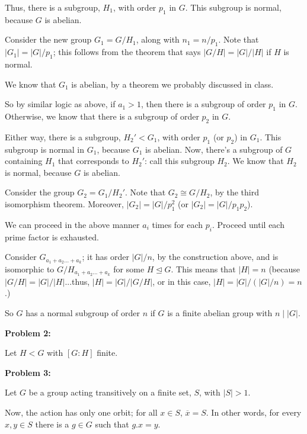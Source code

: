 \documentclass[a4paper,12pt]{article}
\newcommand{\tab}{\hspace{4mm}} %
\newcommand{\shunt}{\vspace{20mm}}
\newcommand{\absval}[1]{\lvert #1 \rvert}
\newcommand{\subgp}{\mathrel{\unlhd}}
\begin{document}
\tab Thus, there is a subgroup, $H_1$, with order $p_1$ in $G$. This subgroup is normal, because $G$ is abelian. 

\tab Consider the new group $G_1=G/H_1$, along with $n_1 = n/p_1$. Note that $\absval{G_1} = \absval{G}/p_1$; this follows from the theorem that says $\absval{G/H} = \absval{G}/\absval{H}$ if $H$ is normal.

\tab We know that $G_1$ is abelian, by a theorem we probably discussed in class.

\tab So by similar logic as above, if $a_1 > 1$, then there is a subgroup of order $p_1$ in $G$. Otherwise, we know that there is a subgroup of order $p_2$ in $G$.

\tab Either way, there is a subgroup, $H_2' < G_1$, with order $p_1$ (or $p_2$) in $G_1$. This subgroup is normal in $G_1$, because $G_1$ is abelian. Now, there's a subgroup of $G$ containing $H_1$ that corresponds to $H_2'$: call this subgroup $H_2$. We know that $H_2$ is normal, because $G$ is abelian.

\tab Consider the group $G_2=G_1/H_2'$. Note that $G_2 \cong G/H_2$, by the third isomorphism theorem. Moreover, $\absval{G_2} = \absval{G}/p_1^2$ (or $\absval{G_2} = \absval{G}/p_1p_2$).

\tab We can proceed in the above manner $a_i$ times for each $p_i$. Proceed until each prime factor is exhausted.

Consider $G_{a_1+a_2 \ldots +a_k}$; it has order $\absval{G}/n$, by the construction above, and is isomorphic to $G/H_{a_1+a_2 \ldots +a_k}$ for some $H \subgp G$. This means that $\absval{H} = n$ (because $\absval{G/H} = \absval{G}/\absval{H}$...thus, $\absval{H} = \absval{G}/\absval{G/H}$, or in this case, $\absval{H} = \absval{G}/(\absval{G}/n) = n$.)

So $G$ has a normal subgroup of order $n$ if $G$ is a finite abelian group with $n \mid \absval{G}$.

\shunt

{\bf Problem 2:}

Let $H < G$ with $[G:H]$ finite.

\shunt

{\bf Problem 3:}

Let $G$ be a group acting transitively on a finite set, $S$, with $\absval{S} > 1$.

Now, the action has only one orbit; for all $x \in S$, $\overline{x} = S$. In other words, for every $x, y \in S$ there is a $g \in G$ such that $g.x = y$.
\end{document}
